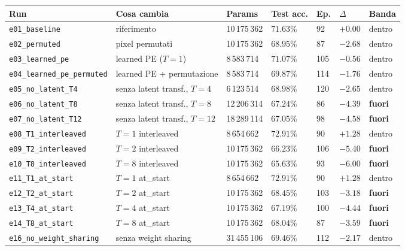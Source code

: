 \documentclass[
  11pt,
]{article}
\begin{document}
\begin{center}
{\scriptsize
\begin{tabular}{@{}p{3.1cm}p{3.3cm}p{1.5cm}p{1.2cm}p{0.7cm}p{1.0cm}p{0.9cm}@{}}
\toprule
\textbf{Run} & \textbf{Cosa cambia} & \textbf{Params} & \textbf{Test acc.} & \textbf{Ep.} & \textbf{$\Delta$} & \textbf{Banda} \\
\midrule
\texttt{e01\_baseline} & riferimento & 10\,175\,362 & $71.63\%$ & 92 & $+0.00$ & dentro \\
\texttt{e02\_permuted} & pixel permutati & 10\,175\,362 & $68.95\%$ & 87 & $-2.68$ & dentro \\
\texttt{e03\_learned\_pe} & learned PE ($T{=}1$) & 8\,583\,714 & $71.07\%$ & 105 & $-0.56$ & dentro \\
\texttt{e04\_learned\_pe\_permuted} & learned PE + permutazione & 8\,583\,714 & $69.87\%$ & 114 & $-1.76$ & dentro \\
\texttt{e05\_no\_latent\_T4} & senza latent transf., $T{=}4$ & 6\,123\,514 & $68.98\%$ & 120 & $-2.65$ & dentro \\
\texttt{e06\_no\_latent\_T8} & senza latent transf., $T{=}8$ & 12\,206\,314 & $67.24\%$ & 86 & $-4.39$ & \textbf{fuori} \\
\texttt{e07\_no\_latent\_T12} & senza latent transf., $T{=}12$ & 18\,289\,114 & $67.05\%$ & 98 & $-4.58$ & \textbf{fuori} \\
\texttt{e08\_T1\_interleaved} & $T{=}1$ interleaved & 8\,654\,662 & $72.91\%$ & 90 & $+1.28$ & dentro \\
\texttt{e09\_T2\_interleaved} & $T{=}2$ interleaved & 10\,175\,362 & $66.23\%$ & 106 & $-5.40$ & \textbf{fuori} \\
\texttt{e10\_T8\_interleaved} & $T{=}8$ interleaved & 10\,175\,362 & $65.63\%$ & 93 & $-6.00$ & \textbf{fuori} \\
\texttt{e11\_T1\_at\_start} & $T{=}1$ at\_start & 8\,654\,662 & $72.91\%$ & 90 & $+1.28$ & dentro \\
\texttt{e12\_T2\_at\_start} & $T{=}2$ at\_start & 10\,175\,362 & $68.45\%$ & 103 & $-3.18$ & \textbf{fuori} \\
\texttt{e13\_T4\_at\_start} & $T{=}4$ at\_start & 10\,175\,362 & $67.19\%$ & 100 & $-4.44$ & \textbf{fuori} \\
\texttt{e14\_T8\_at\_start} & $T{=}8$ at\_start & 10\,175\,362 & $68.04\%$ & 87 & $-3.59$ & \textbf{fuori} \\
\texttt{e16\_no\_weight\_sharing} & senza weight sharing & 31\,455\,106 & $69.46\%$ & 112 & $-2.17$ & dentro \\

\end{tabular}}
\end{center}
\end{document}

